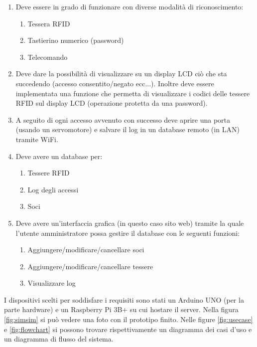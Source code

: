 \documentclass[12pt]{report}
\begin{document}
\begin{enumerate}
	\item Deve essere in grado di funzionare con diverse modalità di riconoscimento:
	\begin{enumerate}
		\item Tessera RFID
		\item Tastierino numerico (password)
		\item Telecomando 
	\end{enumerate}
	\item Deve dare la possibilità di visualizzare su un display LCD ciò che sta succedendo (accesso consentito/negato ecc...). Inoltre deve essere implementata una funzione che permetta di visualizzare i codici delle tessere RFID sul display LCD (operazione protetta da una password).
	\item A seguito di ogni accesso avvenuto con successo deve aprire una porta (usando un servomotore) e salvare il log in un database remoto (in LAN) tramite WiFi.
	\item Deve avere un database per:
	\begin{enumerate}
		\item Tessere RFID
		\item Log degli accessi
		\item Soci
	\end{enumerate}
	\item Deve avere un'interfaccia grafica (in questo caso sito web) tramite la quale l'utente amministratore possa gestire il database con le seguenti funzioni: \begin{enumerate}
		\item Aggiungere/modificare/cancellare soci 
		\item Aggiungere/modificare/cancellare tessere 
		\item Visualizzare log
	\end{enumerate}
\end{enumerate}

I dispositivi scelti per soddisfare i requisiti sono stati un Arduino UNO (per la parte hardware) e un Raspberry Pi 3B+ su cui hostare il server. 
Nella figura \ref{fig:simsim} si può vedere una foto con il prototipo finito.
Nelle figure \ref{fig:usecase} e \ref{fig:flowchart} si possono trovare rispettivamente un diagramma dei casi d'uso e un diagramma di flusso del sistema.
\end{document}
